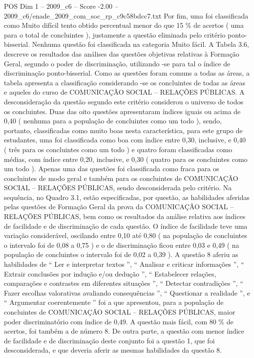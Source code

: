 \begin{textsample}{POS Dim 1 – 2009\_c6 – Score -2.00 – 2009\_c6/enade\_2009\_com\_soc\_rp\_c9c58bdcc7.txt}
Por fim, uma foi classificada como Muito difícil tento obtido percentual menor do que 15 \% de acertos ( uma para o total de concluintes ), justamente a questão eliminada pelo critério ponto-bisserial.
Nenhuma questão foi classificada na categoria Muito fácil.
A Tabela 3.6, descreve os resultados das análises das questões objetivas relativas à Formação Geral, segundo o poder de discriminação, utilizando -se para tal o índice de discriminação ponto-bisserial.
Como as questões foram comuns a todas as áreas, a tabela apresenta a classificação considerando -se os concluintes de todas as áreas e aqueles do curso de COMUNICAÇÃO SOCIAL – RELAÇÕES PÚBLICAS.
A desconsideração da questão segundo este critério considerou o universo de todos os concluintes.
Duas das oito questões apresentaram índices iguais ou acima de 0,40 ( nenhuma para a população de concluintes como um todo ), sendo, portanto, classificadas como muito boas nesta característica, para este grupo de estudantes, uma foi classificada como boa com índice entre 0,30, inclusive, e 0,40 ( três para os concluintes como um todo ) e quatro foram classificadas como médias, com índice entre 0,20, inclusive, e 0,30 ( quatro para os concluintes como um todo ).
Apenas uma das questões foi classificada como fraca para os concluintes de modo geral e também para os concluintes de COMUNICAÇÃO SOCIAL – RELAÇÕES PÚBLICAS, sendo desconsiderada pelo critério.
Na sequência, no Quadro 3.1, estão especificadas, por questão, as habilidades aferidas pelas questões de Formação Geral da prova da COMUNICAÇÃO SOCIAL – RELAÇÕES PÚBLICAS, bem como os resultados da análise relativa aos índices de facilidade e de discriminação de cada questão.
O índice de facilidade teve uma variação considerável, oscilando entre 0,10 até 0,80 ( na população de concluintes o intervalo foi de 0,08 a 0,75 ) e o de discriminação ficou entre 0,03 e 0,49 ( na população de concluintes o intervalo foi de 0,02 a 0,39 ).
A questão 8 aferiu as habilidades de “ Ler e interpretar textos ”, “ Analisar e criticar informações ”, “ Extrair conclusões por indução e/ou dedução ”, “ Estabelecer relações, comparações e contrastes em diferentes situações ”, “ Detectar contradições ”, “ Fazer escolhas valorativas avaliando consequências ”, “ Questionar a realidade ”, e “ Argumentar coerentemente ” foi a que apresentou, para a população de concluintes de COMUNICAÇÃO SOCIAL – RELAÇÕES PÚBLICAS, maior poder discriminatório com índice de 0,49.
A questão mais fácil, com 80 \% de acertos, foi também a de número 8.
De outra parte, a questão com menor índice de facilidade e de discriminação deste conjunto foi a questão 1, que foi desconsiderada, e que deveria aferir as mesmas habilidades da questão 8.

\end{textsample}
